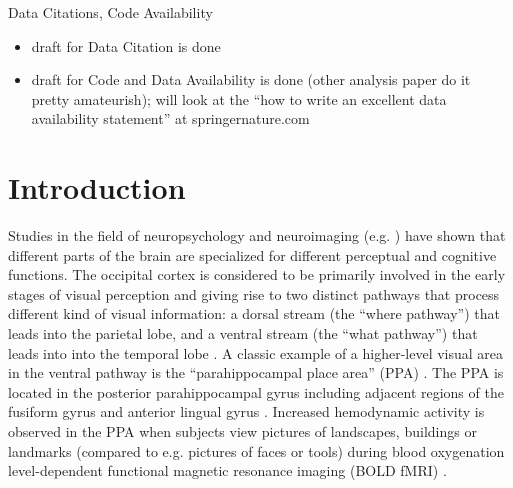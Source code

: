 \documentclass[english]{article}
\begin{document}
\noindent Data Citations, Code Availability
\begin{itemize}
    \item draft for Data Citation is done
    \item draft for Code and Data Availability is done (other analysis paper do
        it pretty amateurish); will look at the ``how to write an excellent
        data availability statement'' at springernature.com
\end{itemize}

\pagebreak[4]


\section{Introduction}


Studies in the field of neuropsychology and neuroimaging (e.g.
\citep{penfield1950cerebral, fox1984noninvasive}) have shown that different
parts of the brain are specialized for different perceptual and cognitive
functions.
The occipital cortex is considered to be primarily involved in the early stages
of visual perception and giving rise to two distinct pathways that process
different kind of visual information:
a dorsal stream (the ``where pathway'') that leads into the parietal lobe, and a
ventral stream (the ``what pathway'') that leads into into the temporal lobe
\citep{goodale1992separate, mishkin1982contribution}.
A classic example of a higher-level visual area in the ventral pathway is the
``parahippocampal place area'' (PPA) \citep{epstein1998ppa,
epstein1999parahippocampal}.
The PPA is located in the posterior parahippocampal gyrus including adjacent
regions of the fusiform gyrus and anterior lingual gyrus
\citep{epstein2008parahippocampal}.
Increased hemodynamic activity is observed in the PPA when subjects view
pictures of landscapes, buildings or landmarks (compared to e.g. pictures of
faces or tools) during blood oxygenation level-dependent functional magnetic
resonance imaging (BOLD fMRI) \citep{aguirre1998area, epstein2014neural,
epstein1998ppa, troiani2012object}.
\end{document}

